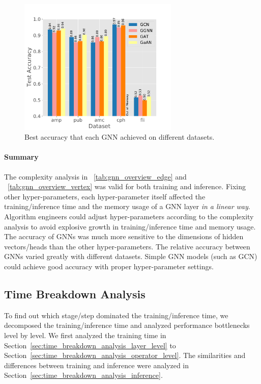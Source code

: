 \begin{figure}[H]
    \centering
    \includegraphics[width=3in]{figs/experiments/exp_hyperparameter_on_accuracy_alg_contrast.pdf}
    \caption{Best accuracy that each GNN achieved on different datasets.}
    \label{fig:exp_hyperparameter_on_accuracy_alg_contrast}
\end{figure}

\paragraph{Summary}

The complexity analysis in \tablename~\ref{tab:gnn_overview_edge} and \tablename~\ref{tab:gnn_overview_vertex} was valid for both training and inference.
%
Fixing other hyper-parameters, each hyper-parameter itself affected the training/inference time and the memory usage of a GNN layer \emph{in a linear way}.
%
Algorithm engineers could adjust hyper-parameters according to the complexity analysis to avoid explosive growth in training/inference time and memory usage.
%
The accuracy of GNNs was much more sensitive to the dimensions of hidden vectors/heads than the other hyper-parameters.
%
The relative accuracy between GNNs varied greatly with different datasets.
%
Simple GNN models (such as GCN) could achieve good accuracy with proper hyper-parameter settings.

\subsection{Time Breakdown Analysis}
\label{sec:time_breakdown_analysis}

To find out which stage/step dominated the training/inference time, we decomposed the training/inference time and analyzed performance bottlenecks level by level.
%
We first analyzed the training time in Section~\ref{sec:time_breakdown_analysis_layer_level} to Section~\ref{sec:time_breakdown_analysis_operator_level}.
%
The similarities and differences between training and inference were analyzed in Section~\ref{sec:time_breakdown_analysis_inference}.

